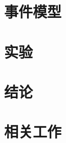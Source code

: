 \documentclass[cs5size,oneside,twocolumn]{ctexart}
\begin{document}
\section{事件模型}


\section{实验}

\section{结论}

\section{相关工作}



\onecolumn


\end{document}
